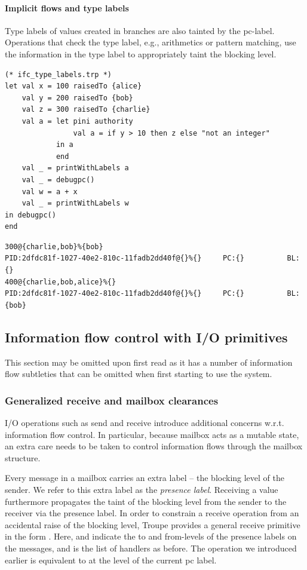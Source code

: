 \paragraph{Implicit flows and type labels}
Type labels of values created in branches are also tainted by the pc-label.
Operations that check the type label, e.g., arithmetics or pattern
matching, use the information in the type label to appropriately taint the blocking level.
\begin{lstlisting}
(* ifc_type_labels.trp *)
let val x = 100 raisedTo {alice}
    val y = 200 raisedTo {bob}
    val z = 300 raisedTo {charlie}
    val a = let pini authority
                val a = if y > 10 then z else "not an integer"
            in a
            end
    val _ = printWithLabels a
    val _ = debugpc()
    val w = a + x
    val _ = printWithLabels w
in debugpc()
end
\end{lstlisting}
\begin{verbatim}
300@{charlie,bob}%{bob}
PID:2dfdc81f-1027-40e2-810c-11fadb2dd40f@{}%{}     PC:{}          BL:{}
400@{charlie,bob,alice}%{}
PID:2dfdc81f-1027-40e2-810c-11fadb2dd40f@{}%{}     PC:{}          BL:{bob}
\end{verbatim}


\subsection{Information flow control with I/O primitives}
This section may be omitted upon first read as it has a number of information flow subtleties that
can be omitted when first starting to use the system.


\subsubsection{Generalized receive and mailbox clearances}
I/O operations such as send and receive introduce additional concerns w.r.t.
information flow control. In particular, because mailbox acts as a mutable state, an extra
care needs to be taken to control information flows through the mailbox structure.

Every message in a mailbox carries an extra label -- the blocking level of the sender. We refer to this
extra label as the \emph{presence label}.
Receiving a value furthermore propagates the taint of the blocking level from the sender to the receiver via the presence label.
In order to constrain a receive operation from an accidental raise of the blocking level, Troupe
provides a general receive primitive in the form
. Here,  and 
indicate the to and from-levels of the presence labels on the messages, and  is the list of
handlers as before.
The  operation we introduced earlier is equivalent to 
at the level of the current pc label.

